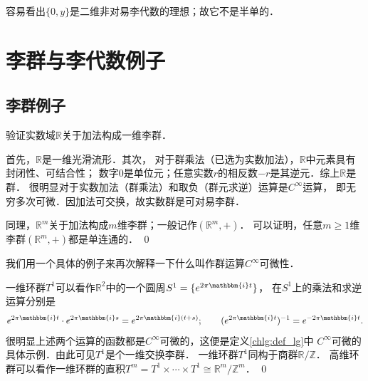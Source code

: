 容易看出$\{0, y\}$是二维非对易李代数的理想；故它不是半单的．




\section{李群与李代数例子}\label{chlg:sec_example}


\subsection{李群例子}
\begin{example}\label{chlg:exam_Rplus}
    验证实数域$\mathbb{R}$关于加法构成一维李群．
    
    首先，$\mathbb{R}$是一维光滑流形．其次，
    对于群乘法（已选为实数加法），$\mathbb{R}$中元素具有封闭性、可结合性；
    数字$0$是单位元；任意实数$r$的相反数$-r$是其逆元．综上$\mathbb{R}$是群．
    很明显对于实数加法（群乘法）和取负（群元求逆）运算是$C^\infty$运算，
    即无穷多次可微．因加法可交换，故实数群是可对易李群．
    
    同理，$\mathbb{R}^m$关于加法构成$m$维李群；一般记作$(\mathbb{R}^m,+)$． 
    可以证明，任意$m \geqslant 1$维李群$(\mathbb{R}^m,+)$都是{\kaishu 单连通}的． \qed
\end{example}


我们用一个具体的例子来再次解释一下什么叫作群运算$C^\infty$可微性．
\begin{example}\label{chlg:exam_1loopT}
    一维环群$T^1$可以看作$\mathbb{R}^2$中的一个圆周$S^1=\{e^{2\pi \mathbbm{i}t} \}$，
    在$S^1$上的乘法和求逆运算分别是
    \begin{align*}
        e^{2\pi \mathbbm{i}t} \cdot e^{2\pi \mathbbm{i}s} = e^{2\pi \mathbbm{i}(t+s)}; \qquad
        (e^{2\pi \mathbbm{i}t})^{-1} = e^{-2\pi \mathbbm{i}t} .
    \end{align*}
    很明显上述两个运算的函数都是$C^\infty$可微的，这便是定义\ref{chlg:def_lg}中
    $C^\infty$可微的具体示例．由此可见$T^1$是个一维交换李群．
    一维环群$T^1$同构于商群$\mathbb{R}/\mathbb{Z}$． %
    高维环群可以看作一维环群的直积$T^m=T^1\times \cdots \times T^1 \cong \mathbb{R}^m/\mathbb{Z}^m$．
    \qed
\end{example}

